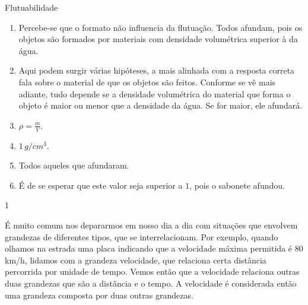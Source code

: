 \begin{answer}{Flutuabilidade}
{\begin{enumerate}
\item {} 
Percebe-se que o formato não influencia da flutuação. Todos afundam, pois os objetos são formados por materiais  com densidade volumétrica superior à da água.

\item {} 
Aqui podem surgir várias hipóteses, a mais alinhada com a resposta correta fala sobre o material de que os objetos são feitos. Conforme se vê mais adiante, tudo depende se a densidade volumétrica do material que forma o objeto é maior ou menor que a densidade da água. Se for maior, ele afundará.

\item {} 
\(\rho = \frac{m}{V}\).

\item {} 
\(1 \,g/cm^3\).

\item {} 
Todos aqueles que afundaram.

\item {} 
É de se esperar que este valor seja superior a \(1\), pois o sabonete afundou.
\end{enumerate}
}{1}
\end{answer}


\label{\detokenize{NO103-2::doc}}\label{\detokenize{NO103-2:explorando-grandezas-compostas}}


É muito comum nos depararmos em nosso dia a dia com situações que envolvem grandezas de diferentes tipos, que se interrelacionam. Por exemplo, quando olhamos na estrada uma placa indicando que a velocidade máxima permitida é $80$ km/h, lidamos com a grandeza velocidade, que relaciona certa distância percorrida por unidade de tempo. Vemos então que a  velocidade relaciona outras duas  grandezas que são a distância e o tempo. A velocidade é considerada então uma grandeza composta por duas outras grandezas.

